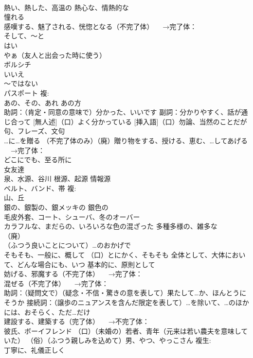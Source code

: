 \documentclass[8pt]{extreport}
\begin{document}
\begin{CJK}{UTF8}{min}
\\	熱い、熱した、高温の 熱心な、情熱的な
\\	憧れる 
\\	感嘆する、魅了される、恍惚となる（不完了体） 　→完了体：
\\	そして、〜と
\\	はい
\\	やぁ（友人と出会った時に使う）
\\	ボルシチ
\\	いいえ
\\	～ではない
\\	パスポート 複:
\\	あの、その、あれ あの方 
\\	助詞：（肯定・同意の意味で）分かった、いいです 副詞：分かりやすく、話が通じ合って [無人述]（口）よく分かっている [挿入語]（口）勿論、当然のことだが
\\	句、フレーズ、文句
\\	…に…を贈る （不完了体のみ）（廃）贈り物をする、授ける、恵む、…してあげる 　→完了体：
\\	どこにでも、至る所に
\\	女友達
\\	泉、水源、谷川 根源、起源 情報源
\\	ベルト、バンド、帯 複:
\\	山、丘
\\	銀の、銀製の、銀メッキの 銀色の
\\	毛皮外套、コート、シューバ、冬のオーバー
\\	カラフルな、まだらの、いろいろな色の混ざった 多種多様の、雑多な
\\	（廃）
\\	（ふつう良いことについて）…のおかげで
\\	そもそも、一般に、概して （口）とにかく、そもそも 全体として、大体において、どんな場合にも、いつ 基本的に、原則として
\\	妨げる、邪魔する（不完了体） 　→完了体：
\\	混ぜる（不完了体） 　→完了体：
\\	助詞：（疑問文で）（疑念・不信・驚きの意を表して）果たして…か、ほんとうにそうか 接続詞：（譲歩のニュアンスを含んだ限定を表して）…を除いて、…のほかには、おそらく、ただ…だけ
\\	建設する、建築する（完了体） 　→不完了体：
\\	彼氏、ボーイフレンド （口）（未婚の）若者、青年（元来は若い農夫を意味していた） （俗）（ふつう親しみを込めて）男、やつ、やっこさん 複生:
\\	丁寧に、礼儀正しく

\end{CJK}
\end{document}
